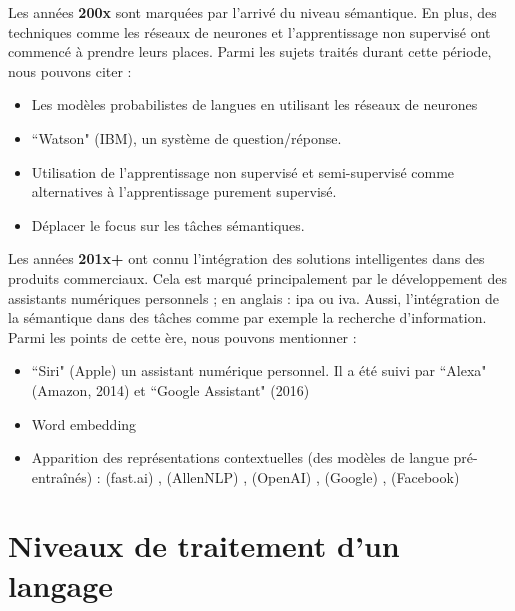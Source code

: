 \documentclass{KodeBook}
\begin{document}
Les années \textbf{200x} sont marquées par l'arrivé du niveau sémantique. 
En plus, des techniques comme les réseaux de neurones et l'apprentissage non supervisé ont commencé à prendre leurs places.
Parmi les sujets traités durant cette période, nous pouvons citer :
\begin{itemize}
	\item {} Les modèles probabilistes de langues en utilisant les réseaux de neurones \cite{2003-bengio-al}
	\item {} ``Watson" (IBM), un système de question/réponse.
	\item Utilisation de l'apprentissage non supervisé et semi-supervisé comme alternatives à l'apprentissage purement supervisé.
	\item Déplacer le focus sur les tâches sémantiques.
\end{itemize}

Les années \textbf{201x+} ont connu l'intégration des solutions intelligentes dans des produits commerciaux.
Cela est marqué principalement par le développement des assistants numériques personnels ; en anglais : \ac{ipa} ou \ac{iva}.
Aussi, l'intégration de la sémantique dans des tâches comme par exemple la recherche d'information. 
Parmi les points de cette ère, nous pouvons mentionner :
\begin{itemize}
	\item {} ``Siri" (Apple)  un assistant numérique personnel. Il a été suivi par ``Alexa" (Amazon, 2014) et ``Google Assistant" (2016)
	\item {} Word embedding \cite{2014-lebret-collobert}
	\item {} Apparition des représentations contextuelles (des modèles de langue pré-entraînés) :  (fast.ai) \cite{2018-howard-ruder},  (AllenNLP) \cite{2018-peters-al},  (OpenAI) \cite{2018-radford-al},  (Google) \cite{2018-devlin-al},  (Facebook) \cite{2019-lample-conneau}
\end{itemize}

\section{Niveaux de traitement d'un langage}
\end{document}
